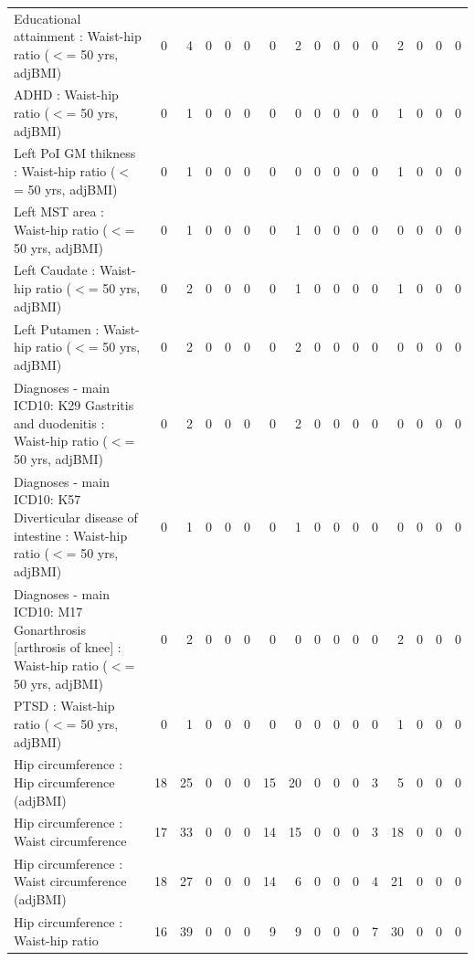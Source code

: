 \begin{table}[ht]
\begin{tabular}{lrrrrrrrrrrrrrrr}
  Educational attainment : Waist-hip ratio ($<$= 50 yrs, adjBMI) &   0 &   4 &   0 &   0 &   0 &   0 &   2 &   0 &   0 &   0 &   0 &   2 &   0 &   0 &   0 \\ 
  ADHD : Waist-hip ratio ($<$= 50 yrs, adjBMI) &   0 &   1 &   0 &   0 &   0 &   0 &   0 &   0 &   0 &   0 &   0 &   1 &   0 &   0 &   0 \\ 
  Left PoI GM thikness : Waist-hip ratio ($<$= 50 yrs, adjBMI) &   0 &   1 &   0 &   0 &   0 &   0 &   0 &   0 &   0 &   0 &   0 &   1 &   0 &   0 &   0 \\ 
  Left MST area : Waist-hip ratio ($<$= 50 yrs, adjBMI) &   0 &   1 &   0 &   0 &   0 &   0 &   1 &   0 &   0 &   0 &   0 &   0 &   0 &   0 &   0 \\ 
  Left Caudate : Waist-hip ratio ($<$= 50 yrs, adjBMI) &   0 &   2 &   0 &   0 &   0 &   0 &   1 &   0 &   0 &   0 &   0 &   1 &   0 &   0 &   0 \\ 
  Left Putamen : Waist-hip ratio ($<$= 50 yrs, adjBMI) &   0 &   2 &   0 &   0 &   0 &   0 &   2 &   0 &   0 &   0 &   0 &   0 &   0 &   0 &   0 \\ 
  Diagnoses - main ICD10: K29 Gastritis and duodenitis : Waist-hip ratio ($<$= 50 yrs, adjBMI) &   0 &   2 &   0 &   0 &   0 &   0 &   2 &   0 &   0 &   0 &   0 &   0 &   0 &   0 &   0 \\ 
  Diagnoses - main ICD10: K57 Diverticular disease of intestine : Waist-hip ratio ($<$= 50 yrs, adjBMI) &   0 &   1 &   0 &   0 &   0 &   0 &   1 &   0 &   0 &   0 &   0 &   0 &   0 &   0 &   0 \\ 
  Diagnoses - main ICD10: M17 Gonarthrosis [arthrosis of knee] : Waist-hip ratio ($<$= 50 yrs, adjBMI) &   0 &   2 &   0 &   0 &   0 &   0 &   0 &   0 &   0 &   0 &   0 &   2 &   0 &   0 &   0 \\ 
  PTSD : Waist-hip ratio ($<$= 50 yrs, adjBMI) &   0 &   1 &   0 &   0 &   0 &   0 &   0 &   0 &   0 &   0 &   0 &   1 &   0 &   0 &   0 \\ 
  Hip circumference  : Hip circumference (adjBMI) &  18 &  25 &   0 &   0 &   0 &  15 &  20 &   0 &   0 &   0 &   3 &   5 &   0 &   0 &   0 \\ 
  Hip circumference  : Waist circumference  &  17 &  33 &   0 &   0 &   0 &  14 &  15 &   0 &   0 &   0 &   3 &  18 &   0 &   0 &   0 \\ 
  Hip circumference  : Waist circumference (adjBMI) &  18 &  27 &   0 &   0 &   0 &  14 &   6 &   0 &   0 &   0 &   4 &  21 &   0 &   0 &   0 \\ 
  Hip circumference  : Waist-hip ratio  &  16 &  39 &   0 &   0 &   0 &   9 &   9 &   0 &   0 &   0 &   7 &  30 &   0 &   0 &   0 \\ 

\end{tabular}
\end{table}
